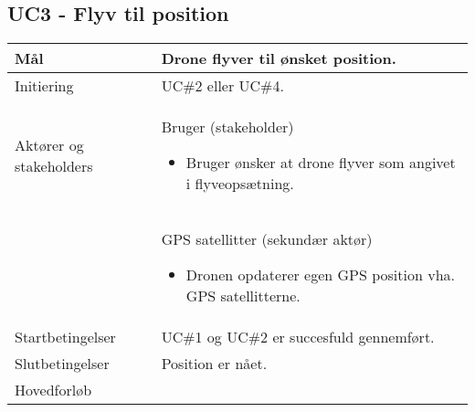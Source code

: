 \subsection*{UC3 - Flyv til position}

\begin{table}[H]
\begin{tabular}{| p{3cm}| p{11.5cm}|}
\hline


Mål	 							& Drone flyver til ønsket position. \\\hline
Initiering 							& UC\#2 eller UC\#4. \\\hline
Aktører og \newline stakeholders			& Bruger (stakeholder) 

										\begin{itemize}
											\item Bruger ønsker at drone flyver som angivet i flyveopsætning.
										\end{itemize} \\  
										
										& GPS satellitter (sekundær aktør) 

										\begin{itemize}
											\item Dronen opdaterer egen GPS position vha. GPS satellitterne.
										\end{itemize} \\ \hline
Startbetingelser							& UC\#1 og UC\#2 er succesfuld gennemført. \\\hline
Slutbetingelser						& Position er nået. \\\hline
Hovedforløb				&
 
									\renewcommand{\labelenumi}{\arabic{enumi}.}
									\renewcommand{\labelenumii}{\Roman{enumii}:}


\end{tabular}
\end{table}
